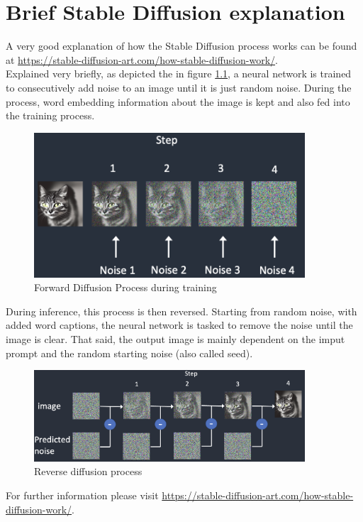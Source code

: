 \documentclass[
  a4paper,  %
  twoside,  %
  bibliography=totoc,
  headsepline,
  cleardoublepage=empty,
  parskip=half,
  draft=false
]{scrbook}
\begin{document}
\chapter{Brief Stable Diffusion explanation}
\label{app:diff-workflow}
A very good explanation of how the Stable Diffusion process works can be found at \url{https://stable-diffusion-art.com/how-stable-diffusion-work/}. \\
Explained very briefly, as depicted the in figure \ref{fig:forward-diff}, a neural network is trained to consecutively add noise to an image until it is just random noise. During the process, word embedding information about the image is kept and also fed into the training process.
\begin{figure}[h]
  \centering
  \includegraphics[width=0.9\textwidth]{./graphics/images/forward-diff.png}
  \caption{Forward Diffusion Process during training \cite{andrewHowDoesStable2022}}
  \label{fig:forward-diff}
\end{figure}

During inference, this process is then reversed. Starting from random noise, with added word captions, the neural network is tasked to remove the noise until the image is clear. That said, the output image is mainly dependent on the imput prompt and the random starting noise (also called seed).

\begin{figure}[h]
  \centering
  \includegraphics[width=0.9\textwidth]{./graphics/images/reverse-diff.png}
  \caption{Reverse diffusion process \cite{andrewHowDoesStable2022}}
  \label{fig:backward-diff}
\end{figure}

For further information please visit \url{https://stable-diffusion-art.com/how-stable-diffusion-work/}.



% 

\pagestyle{empty}
\renewcommand*{\chapterpagestyle}{empty}
\Affirmation
\end{document}
